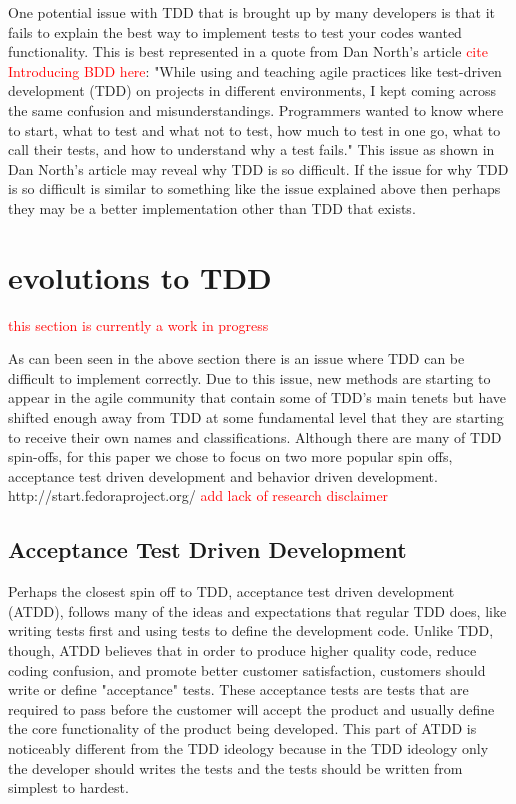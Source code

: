 \documentclass{sig-alternate}
\newcommand{\mycomment}[1]{\textcolor{red}{#1}}
\begin{document}
One potential issue with TDD that is brought up by many developers is that it fails to explain the best way to implement tests to test your codes wanted functionality.  This is best represented in a quote from Dan North's article \mycomment{cite Introducing BDD here}: "While using and teaching agile practices like test-driven development (TDD) on projects in different environments, I kept coming across the same confusion and misunderstandings. Programmers wanted to know where to start, what to test and what not to test, how much to test in one go, what to call their tests, and how to understand why a test fails."  This issue as shown in Dan North's article may reveal why TDD is so difficult.  If the issue for why TDD is so difficult is similar to something like the issue explained above then perhaps they may be a better implementation other than TDD that exists.  

\section{evolutions to TDD}
\mycomment{this section is currently a work in progress}

As can been seen in the above section there is an issue where TDD can be difficult to implement correctly.  Due to this issue, new methods are starting to appear in the agile community that contain some of TDD's main tenets but have shifted enough away from TDD at some fundamental level that they are starting to receive their own names and classifications.  Although there are many of TDD spin-offs, for this paper we chose to focus on two more popular spin offs, acceptance test driven development and behavior driven development.
http://start.fedoraproject.org/
\mycomment{add lack of research disclaimer}

\subsection{Acceptance Test Driven Development}

Perhaps the closest spin off to TDD, acceptance test driven development (ATDD), follows many of the ideas and expectations that regular TDD does, like writing tests first and using tests to define the development code.  Unlike TDD, though, ATDD believes that in order to produce higher quality code, reduce coding confusion, and promote better customer satisfaction, customers should write or define "acceptance" tests.  These acceptance tests are tests that are required to pass before the customer will accept the product and usually define the core functionality of the product being developed.  This part of ATDD is noticeably different from the TDD ideology because in the TDD ideology only the developer should writes the tests and the tests should be written from simplest to hardest.~\cite{Hammond:2012}
\end{document}
